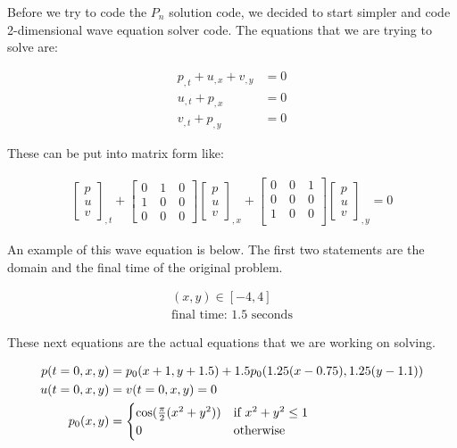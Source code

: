 
Before we try to code the $P_n$ solution code, we decided to start simpler and code 2-dimensional wave equation solver code. The equations that we are trying to solve are:

\begin{align*}
p_{,t} + u_{,x} + v_{,y} &= 0 \\
u_{,t} + p_{,x} &= 0 \\
v_{,t} + p_{,y} &= 0
\end{align*}

These can be put into matrix form like:

\begin{align*}
\begin{bmatrix}
p \\
u \\
v
\end{bmatrix}
_{,t}
+
\begin{bmatrix}
0\quad1\quad0 \\
1\quad0\quad0 \\
0\quad0\quad0
\end{bmatrix}
\begin{bmatrix}
p \\
u \\
v
\end{bmatrix}
_{,x}
+
\begin{bmatrix}
0\quad0\quad1 \\
0\quad0\quad0 \\
1\quad0\quad0 \\
\end{bmatrix}
\begin{bmatrix}
p \\
u \\
v
\end{bmatrix}
_{,y}
= 0
\end{align*}

An example of this wave equation is below. The first two statements are the domain and the final time of the original problem.

\begin{align*}
(x, y) \in [-4, 4] \\
\text{final time: 1.5 seconds}
\end{align*}

These next equations are the actual equations that we are working on solving.

\begin{align*}
p(t = 0, x, y) & = p_0(x + 1, y + 1.5) + 1.5p_0(1.25(x - 0.75), 1.25(y - 1.1)) \\
u(t = 0, x, y) & = v(t = 0, x, y) = 0 \\
p_0(x, y) & = 
\begin{cases}
\cos(\frac{\pi}{2}(x^2 + y^2)) & \text{if } x^2 + y^2 \leq 1 \\
0 & \mbox{\text{otherwise} }
\end{cases}
\end{align*}

